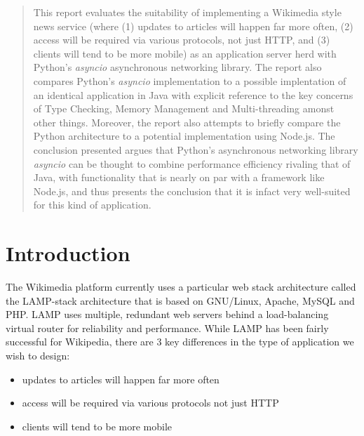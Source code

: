 \begin{abstract}
This report evaluates the suitability of implementing a Wikimedia style news service (where (1) updates to articles will happen far more often, (2) access will be required via various protocols, not just HTTP, and (3) clients will tend to be more mobile) as an application server herd with Python's \emph{asyncio} asynchronous networking library. The report also compares Python's \emph{asyncio} implementation to a possible implentation of an identical application in Java with explicit reference to the key concerns of Type Checking, Memory Management and Multi-threading amonst other things. Moreover, the report also attempts to briefly compare the Python architecture to a potential implementation using Node.js. The conclusion presented argues that Python's asynchronous networking library \emph{asyncio} can be thought to combine performance efficiency rivaling that of Java, with functionality that is nearly on par with a framework like Node.js, and thus presents the conclusion that it is infact very well-suited for this kind of application. \end{abstract}

\section{Introduction}
The Wikimedia platform currently uses a particular web stack architecture called the LAMP-stack architecture that is based on GNU/Linux, Apache, MySQL and PHP. LAMP uses multiple, redundant web servers behind a load-balancing virtual router for reliability and performance. While LAMP has been fairly successful for Wikipedia, there are 3 key differences in the type of application we wish to design:
\begin{itemize}
\item updates to articles will happen far more often
\item access will be required via various protocols not just HTTP
\item clients will tend to be more mobile
\end{itemize}

